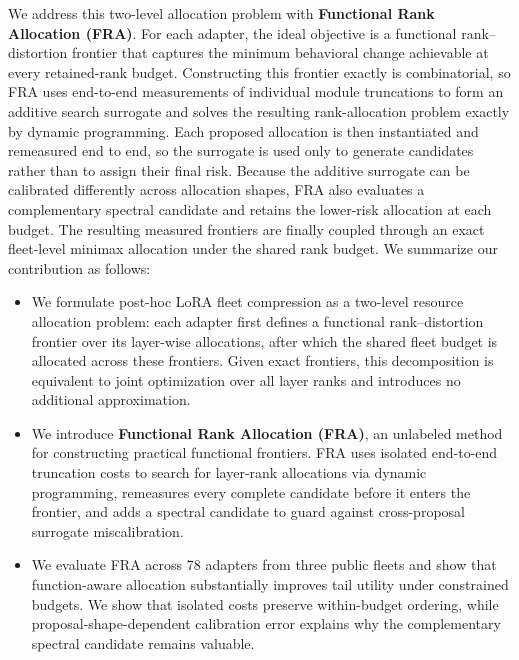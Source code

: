 \documentclass{article}
\begin{document}
We address this two-level allocation problem with \textbf{Functional Rank
Allocation (FRA)}. For each adapter, the ideal objective is a functional
rank--distortion frontier that captures the minimum behavioral change
achievable at every retained-rank budget. Constructing this frontier exactly is
combinatorial, so FRA uses end-to-end measurements of individual module
truncations to form an additive search surrogate and solves the resulting
rank-allocation problem exactly by dynamic programming. Each proposed
allocation is then instantiated and remeasured end to end, so the surrogate is
used only to generate candidates rather than to assign their final risk.
Because the additive surrogate can be calibrated differently across allocation
shapes, FRA also evaluates a complementary spectral candidate and retains the lower-risk
allocation at each budget. The resulting measured frontiers are finally
coupled through an exact fleet-level minimax allocation under the shared rank
budget. We summarize our contribution as follows:
\begin{itemize}[leftmargin=1.5em,labelsep=0.5em]
  \item We formulate post-hoc LoRA fleet compression as a two-level resource
  allocation problem: each adapter first defines a functional
  rank--distortion frontier over its layer-wise allocations, after which the
  shared fleet budget is allocated across these frontiers. Given exact
  frontiers, this decomposition is equivalent to joint optimization over all
  layer ranks and introduces no additional approximation.

  \item We introduce \textbf{Functional Rank Allocation (FRA)}, an unlabeled
  method for constructing practical functional frontiers. FRA uses isolated
  end-to-end truncation costs to search for layer-rank allocations via dynamic
  programming, remeasures every complete candidate before it enters the
  frontier, and adds a spectral candidate to guard against cross-proposal
  surrogate miscalibration.

  \item We evaluate FRA across 78 adapters from three public fleets and show
  that function-aware allocation substantially improves tail utility under
  constrained budgets. We show that isolated costs preserve within-budget
  ordering, while proposal-shape-dependent calibration error explains why the
  complementary spectral candidate remains valuable.
\end{itemize}
\end{document}
